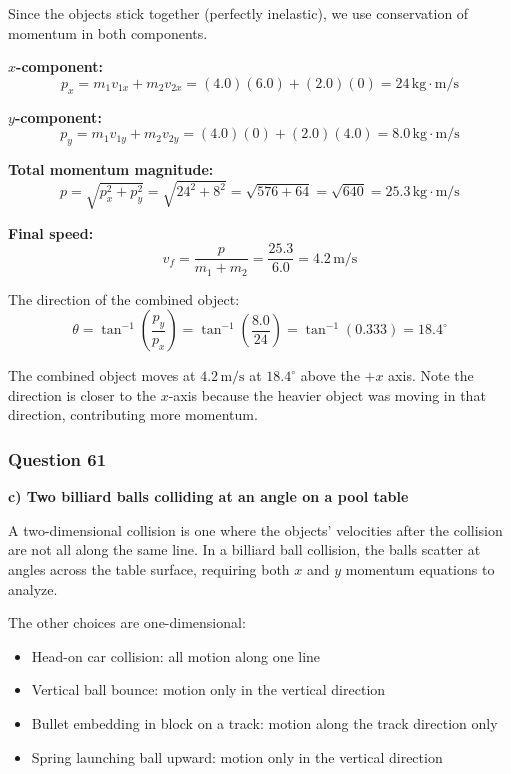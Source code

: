 \documentclass[12pt,letterpaper]{article}
\begin{document}
\begin{explanationbox}
Since the objects stick together (perfectly inelastic), we use conservation of momentum in both components.

\textbf{$x$-component:}
\[
p_x = m_1 v_{1x} + m_2 v_{2x} = (4.0)(6.0) + (2.0)(0) = 24\,\text{kg}\cdot\text{m/s}
\]

\textbf{$y$-component:}
\[
p_y = m_1 v_{1y} + m_2 v_{2y} = (4.0)(0) + (2.0)(4.0) = 8.0\,\text{kg}\cdot\text{m/s}
\]

\textbf{Total momentum magnitude:}
\[
p = \sqrt{p_x^2 + p_y^2} = \sqrt{24^2 + 8^2} = \sqrt{576 + 64} = \sqrt{640} = 25.3\,\text{kg}\cdot\text{m/s}
\]

\textbf{Final speed:}
\[
v_f = \frac{p}{m_1 + m_2} = \frac{25.3}{6.0} = 4.2\,\text{m/s}
\]

The direction of the combined object:
\[
\theta = \tan^{-1}\left(\frac{p_y}{p_x}\right) = \tan^{-1}\left(\frac{8.0}{24}\right) = \tan^{-1}(0.333) = 18.4^\circ
\]

The combined object moves at $4.2\,\text{m/s}$ at $18.4^\circ$ above the $+x$ axis. Note the direction is closer to the $x$-axis because the heavier object was moving in that direction, contributing more momentum.
\end{explanationbox}

\subsubsection*{Question 61}

\begin{answerbox}
\textbf{c) Two billiard balls colliding at an angle on a pool table}
\end{answerbox}

\begin{explanationbox}
A two-dimensional collision is one where the objects' velocities after the collision are not all along the same line. In a billiard ball collision, the balls scatter at angles across the table surface, requiring both $x$ and $y$ momentum equations to analyze.

The other choices are one-dimensional:
\begin{itemize}
\item Head-on car collision: all motion along one line
\item Vertical ball bounce: motion only in the vertical direction
\item Bullet embedding in block on a track: motion along the track direction only
\item Spring launching ball upward: motion only in the vertical direction
\end{itemize}
\end{explanationbox}
\end{document}
